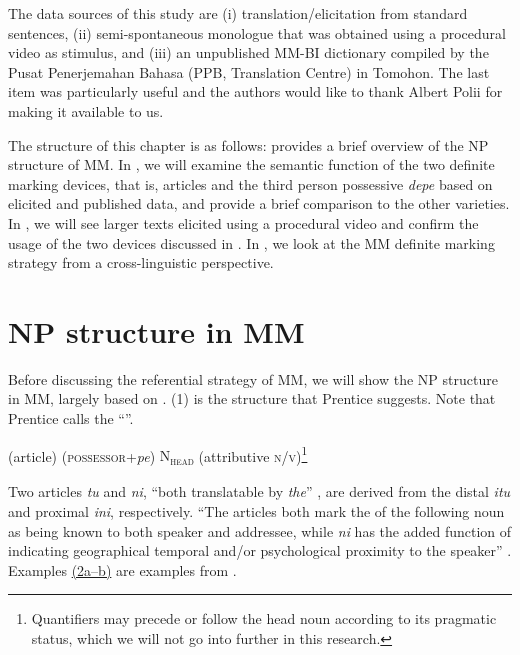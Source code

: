 \documentclass[output=paper
,modfonts
,nonflat]{langsci/langscibook}
\begin{document}
The data sources of this study are (i) translation/elicitation from standard  sentences, (ii) semi-spontaneous monologue that was obtained using a procedural video as stimulus, and (iii) an unpublished MM-BI dictionary compiled by the Pusat Penerjemahan Bahasa (PPB, Translation Centre) in Tomohon. The last item was particularly useful and the authors would like to thank Albert Polii for making it available to us.

The structure of this chapter is as follows:  provides a brief overview of the NP structure of MM. In , we will examine the semantic function of the two definite marking devices, that is, articles and the third person possessive \textit{depe} based on elicited and published data, and provide a brief comparison to the other  varieties. In , we will see larger texts elicited using a procedural video and confirm the usage of the two devices discussed in . In , we look at the MM definite marking strategy from a cross-linguistic perspective.

\section{\label{s:shiohara:2}NP structure in MM}

Before discussing the referential strategy of MM, we will show the NP structure in MM, largely based on \citet[424--429]{Prentice1994}. (1) is the structure that Prentice suggests. Note that Prentice calls the  “”.

\begin{exe}
	\ex\label{e:shiohara:1} (article) (\textsc{possessor}+\textit{pe}) \textsc{N\textsubscript{head}} (attributive \textsc{n}/\textsc{v})\footnote{Quantifiers may precede or follow the head noun according to its pragmatic status, which we will not go into further in this research.}
\end{exe}

\noindent
Two articles \textit{tu} and \textit{ni}, “both translatable by \textit{the}” \citep[424]{Prentice1994}, are derived from the distal  \textit{itu} and proximal  \textit{ini}, respectively. “The articles both mark the  of the following noun as being known to both speaker and addressee, while \textit{ni} has the added function of indicating geographical temporal and\slash or psychological proximity to the speaker” \citep[424]{Prentice1994}. Examples \hyperref[e:shiohara:2a]{(2a--b)} are examples from \citet[424]{Prentice1994}.
\end{document}
